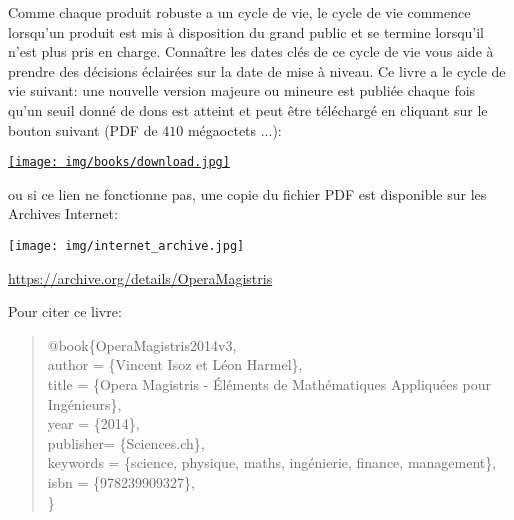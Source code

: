 	Comme chaque produit robuste a un cycle de vie, le cycle de vie commence lorsqu'un produit est mis à disposition du grand public et se termine lorsqu'il n'est plus pris en charge. Connaître les dates clés de ce cycle de vie vous aide à prendre des décisions éclairées sur la date de mise à niveau. Ce livre a le cycle de vie suivant: une nouvelle version majeure ou mineure est publiée chaque fois qu'un seuil donné de dons est atteint et peut être téléchargé en cliquant sur le bouton suivant (PDF de $410$ mégaoctets ...):
	\begin{center}
		\href{http://www.sciences.ch/dwnldbl/telecharger.php3}{\texttt{[image: img/books/download.jpg]}}
	\end{center}
	ou si ce lien ne fonctionne pas, une copie du fichier PDF est disponible sur les Archives Internet:
	\begin{center}
		\texttt{[image: img/internet\_archive.jpg]}
	\end{center}
	\begin{center}
	\href{https://archive.org/details/OperaMagistris}{https://archive.org/details/OperaMagistris}
	\end{center}
	
	Pour citer ce livre:
	\begin{quote}
	\noindent @book\{OperaMagistris2014v3, \\
		  author =       \{Vincent Isoz et Léon Harmel\}, \\
		  title =        \{Opera Magistris - Éléments de Mathématiques Appliquées pour Ingénieurs\}, \\
		  year =         \{2014\}, \\
	      publisher=     \{Sciences.ch\}, \\
		  keywords =     \{science, physique, maths, ingénierie, finance, management\}, \\
		  isbn =          \{978239909327\},\\
	\}
	\end{quote}